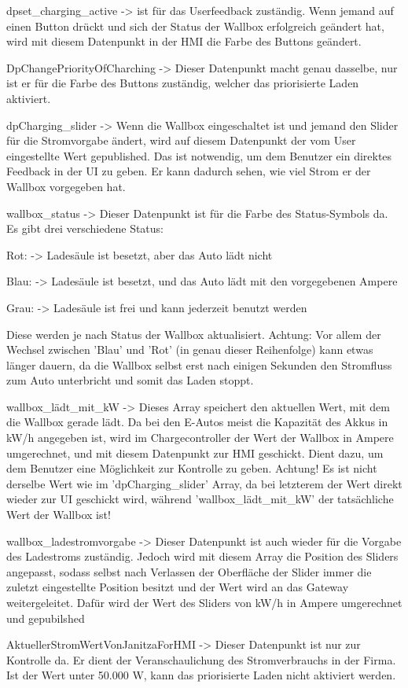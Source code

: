 \begin{compactitem}
  \item dpset\_charging\_active -> ist für das Userfeedback zuständig. Wenn jemand auf einen Button drückt und sich der Status der Wallbox erfolgreich geändert hat, wird mit diesem Datenpunkt in der HMI die Farbe des Buttons geändert.
  \item DpChangePriorityOfCharching -> Dieser Datenpunkt macht genau dasselbe, nur ist er für die Farbe des Buttons zuständig, welcher das priorisierte Laden aktiviert.
  \item dpCharging\_slider -> Wenn die Wallbox eingeschaltet ist und jemand den Slider für die Stromvorgabe ändert, wird auf diesem Datenpunkt der vom User eingestellte Wert gepublished. Das ist notwendig, um dem Benutzer ein direktes Feedback in der UI zu geben. Er kann dadurch sehen, wie viel Strom er der Wallbox vorgegeben hat.
  \item wallbox\_status -> Dieser Datenpunkt ist für die Farbe des Status-Symbols da. Es gibt drei verschiedene Status:
  \begin{compactitem}
    \item Rot: -> Ladesäule ist besetzt, aber das Auto lädt nicht
    \item Blau: -> Ladesäule ist besetzt, und das Auto lädt mit den vorgegebenen Ampere
    \item Grau: -> Ladesäule ist frei und kann jederzeit benutzt werden
  \end{compactitem}
  Diese werden je nach Status der Wallbox aktualisiert. Achtung: Vor allem der Wechsel zwischen 'Blau' und 'Rot' (in genau dieser Reihenfolge) kann etwas länger dauern, da die Wallbox selbst erst nach einigen Sekunden den Stromfluss zum Auto unterbricht und somit das Laden stoppt.

  \item wallbox\_lädt\_mit\_kW -> Dieses Array speichert den aktuellen Wert, mit dem die Wallbox gerade lädt. Da bei den E-Autos meist die Kapazität des Akkus in kW/h angegeben ist, wird im Chargecontroller der Wert der Wallbox in Ampere umgerechnet, und mit diesem Datenpunkt zur HMI geschickt. Dient dazu, um dem Benutzer eine Möglichkeit zur Kontrolle zu geben. Achtung! Es ist nicht derselbe Wert wie im 'dpCharging\_slider' Array, da bei letzterem der Wert direkt wieder zur UI geschickt wird, während 'wallbox\_lädt\_mit\_kW' der tatsächliche Wert der Wallbox ist!
  \item wallbox\_ladestromvorgabe -> Dieser Datenpunkt ist auch wieder für die Vorgabe des Ladestroms zuständig. Jedoch wird mit diesem Array die Position des Sliders angepasst, sodass selbst nach Verlassen der Oberfläche der Slider immer die zuletzt eingestellte Position besitzt und der Wert wird an das Gateway weitergeleitet. Dafür wird der Wert des Sliders von kW/h in Ampere umgerechnet und gepubilshed
  \item AktuellerStromWertVonJanitzaForHMI -> Dieser Datenpunkt ist nur zur Kontrolle da. Er dient der Veranschaulichung des Stromverbrauchs in der Firma. Ist der Wert unter 50.000 W, kann das priorisierte Laden nicht aktiviert werden.
\end{compactitem}

